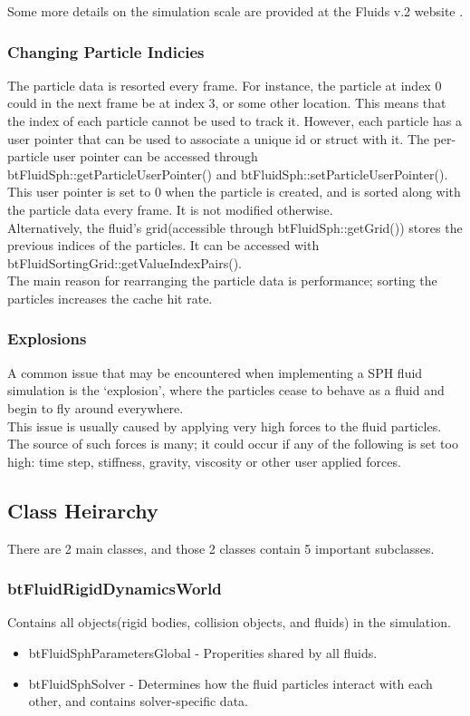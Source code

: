 \documentclass[]{article}
\begin{document}
			Some more details on the simulation scale are provided at the Fluids v.2 website \cite{RH:2008}.
			
		\subsubsection{Changing Particle Indicies}
			The particle data is resorted every frame. For instance, the particle at index 0 could in the next frame be
			at index 3, or some other location. This means that the index of each particle cannot be used to track it. 
			However, each particle has a user pointer that can be used to associate a unique id or struct with it. The 
			per-particle user pointer can be accessed through btFluidSph::getParticleUserPointer() and 
			btFluidSph::setParticleUserPointer(). This user pointer is set to 0 when the particle is created, and is 
			sorted along with the particle data every frame. It is not modified otherwise.\\
			
			Alternatively, the fluid's grid(accessible through btFluidSph::getGrid()) stores the previous indices
			of the particles. It can be accessed with btFluidSortingGrid::getValueIndexPairs().\\
			
			The main reason for rearranging the particle data is performance; sorting the particles increases the cache 
			hit rate.
		
		\subsubsection{Explosions}
			A common issue that may be encountered when implementing a SPH fluid simulation is the `explosion', where 
			the particles cease to behave as a fluid and begin to fly around everywhere.\\
			
			This issue is usually caused by applying very high forces to the fluid particles. The source of such forces 
			is many; it could occur if any of the following is set too high: time step, stiffness, gravity, viscosity 
			or other user applied forces.
	
	\subsection{Class Heirarchy}
		There are 2 main classes, and those 2 classes contain 5 important subclasses.
	
		\subsubsection{btFluidRigidDynamicsWorld}
			Contains all objects(rigid bodies, collision objects, and fluids) in the simulation.
			\begin{itemize}
				\item btFluidSphParametersGlobal - Properities shared by all fluids.
				\item btFluidSphSolver - Determines how the fluid particles interact with each other, and contains solver-specific data.
			\end{itemize}
			
\end{document}
